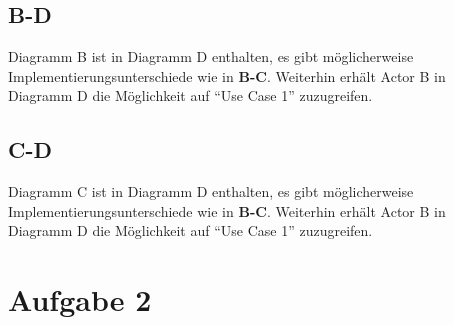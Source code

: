 \documentclass[a4paper]{report}
\begin{document}
\subsection*{B-D}
Diagramm B ist in Diagramm D enthalten, es gibt möglicherweise Implementierungsunterschiede wie in \textbf{B-C}. Weiterhin erhält Actor B in Diagramm D die Möglichkeit auf ``Use Case 1'' zuzugreifen.

\subsection*{C-D}
Diagramm C ist in Diagramm D enthalten, es gibt möglicherweise Implementierungsunterschiede wie in \textbf{B-C}. Weiterhin erhält Actor B in Diagramm D die Möglichkeit auf ``Use Case 1'' zuzugreifen.

\newpage
\section*{Aufgabe 2}




% 	
% 	
% 		
\end{document}
